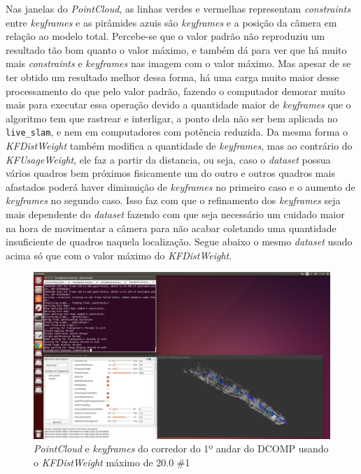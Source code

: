 Nas janelas do \textit{PointCloud}, as linhas verdes e vermelhas representam \textit{constraints} entre \textit{keyframes} e as pirâmides azuis são \textit{keyframes} e a posição da câmera em relação ao modelo total. Percebe-se que o valor padrão não reproduziu um resultado tão bom quanto o valor máximo, e também dá para ver que há muito mais \textit{constraints} e \textit{keyframes} nas imagem com o valor máximo. Mas apesar de se ter obtido um resultado melhor dessa forma, há uma carga muito maior desse processamento do que pelo valor padrão, fazendo o computador demorar muito mais para executar essa operação devido a quantidade maior de \textit{keyframes} que o algoritmo tem que rastrear e interligar, a ponto dela não ser bem aplicada no \texttt{live\_slam}, e nem em computadores com potência reduzida. Da mesma forma o \textit{KFDistWeight} também modifica a quantidade de \textit{keyframes}, mas ao contrário do \textit{KFUsageWeight}, ele faz a partir da distancia, ou seja, caso o \textit{dataset} possua vários quadros bem próximos fisicamente um do outro e outros quadros mais afastados poderá haver diminuição de \textit{keyframes} no primeiro caso e o aumento de \textit{keyframes} no segundo caso. Isso faz com que o refinamento dos \textit{keyframes} seja mais dependente do \textit{dataset} fazendo com que seja necessário um cuidado maior na hora de movimentar a câmera para não acabar coletando uma quantidade insuficiente de quadros naquela localização. Segue abaixo o mesmo \textit{dataset} usado acima só que com o valor máximo do \textit{KFDistWeight}.

\begin{figure}[!htb]
	\centering
		\includegraphics[width= \textwidth]{Imagens/figura3-38.png}
	\caption{\textit{PointCloud} e \textit{keyframes} do corredor do 1º andar do DCOMP usando o \textit{KFDistWeight} máximo de 20.0 \#1}
	\label{fig3:36}
\end{figure}

